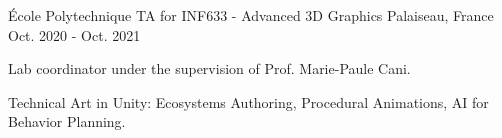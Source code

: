 

\begin{cventries}

  \cventry
    {École Polytechnique} %
    {TA for INF633 - Advanced 3D Graphics} %
    {Palaiseau, France} %
    {Oct. 2020 - Oct. 2021} %
    {
      \begin{cvitems} %
        \item {Lab coordinator under the supervision of Prof. Marie-Paule Cani.}
        \item {Technical Art in Unity: Ecosystems Authoring, Procedural Animations, AI for Behavior Planning.}
      \end{cvitems}
    }

\end{cventries}
